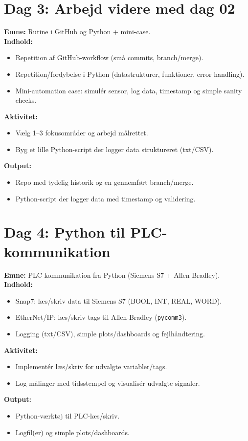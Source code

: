 \documentclass[a4paper,11pt]{article}
\begin{document}
\section{Dag 3: Arbejd videre med dag 02}

\textbf{Emne:} Rutine i GitHub og Python + mini-case.\\
\textbf{Indhold:}
\begin{itemize}
  \item Repetition af GitHub-workflow (små commits, branch/merge).
  \item Repetition/fordybelse i Python (datastrukturer, funktioner, error handling).
  \item Mini-automation case: simulér sensor, log data, timestamp og simple sanity checks.
\end{itemize}
\textbf{Aktivitet:}
\begin{itemize}
  \item Vælg 1--3 fokusområder og arbejd målrettet.
  \item Byg et lille Python-script der logger data struktureret (txt/CSV).
\end{itemize}
\textbf{Output:}
\begin{itemize}
  \item Repo med tydelig historik og en gennemført branch/merge.
  \item Python-script der logger data med timestamp og validering.
\end{itemize}


\section{Dag 4: Python til PLC-kommunikation}

\textbf{Emne:} PLC-kommunikation fra Python (Siemens S7 + Allen-Bradley).\\
\textbf{Indhold:}
\begin{itemize}
  \item Snap7: læs/skriv data til Siemens S7 (BOOL, INT, REAL, WORD).
  \item EtherNet/IP: læs/skriv tags til Allen-Bradley (\texttt{pycomm3}).
  \item Logging (txt/CSV), simple plots/dashboards og fejlhåndtering.
\end{itemize}
\textbf{Aktivitet:}
\begin{itemize}
  \item Implementér læs/skriv for udvalgte variabler/tags.
  \item Log målinger med tidsstempel og visualisér udvalgte signaler.
\end{itemize}
\textbf{Output:}
\begin{itemize}
  \item Python-værktøj til PLC-læs/skriv.
  \item Logfil(er) og simple plots/dashboards.
\end{itemize}
\end{document}
